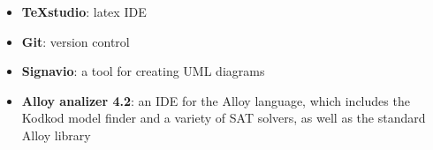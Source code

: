 \begin{itemize}
\item \textbf{TeXstudio}: latex IDE
\item \textbf{Git}: version control
\item \textbf{Signavio}: a tool for creating UML diagrams
\item \textbf{Alloy analizer 4.2}: an IDE for the Alloy language, which includes the Kodkod model finder and a variety of SAT solvers, as well as the standard Alloy library
\end{itemize}